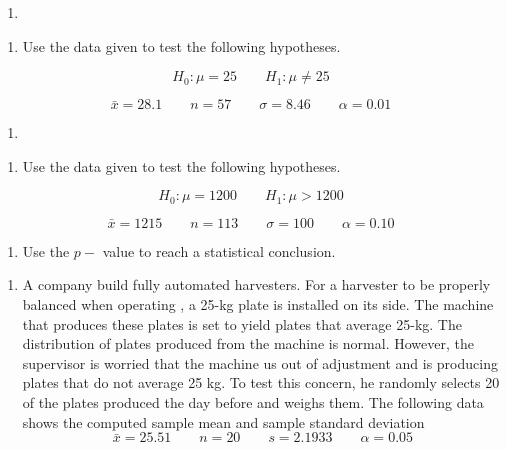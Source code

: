 \documentclass[]{book}
\providecommand{\tightlist}{%
  \setlength{\itemsep}{0pt}\setlength{\parskip}{0pt}}
\begin{document}
\begin{enumerate}
\def\labelenumi{\arabic{enumi}.}
\setcounter{enumi}{1}
\item
\end{enumerate}

\begin{enumerate}
\def\labelenumi{\alph{enumi}.}
\tightlist
\item
  Use the data given to test the following hypotheses.
\end{enumerate}

\[H_0: \mu =25\qquad H_1:\mu\neq 25\]

\[\bar{x}=28.1\qquad n=57 \qquad \sigma =8.46 \qquad \alpha =0.01\]

\begin{enumerate}
\def\labelenumi{\arabic{enumi}.}
\setcounter{enumi}{2}
\item
\end{enumerate}

\begin{enumerate}
\def\labelenumi{\alph{enumi}.}
\tightlist
\item
  Use the data given to test the following hypotheses.
\end{enumerate}

\[H_0: \mu =1200\qquad H_1:\mu> 1200\]

\[\bar{x}=1215\qquad n=113 \qquad \sigma =100 \qquad \alpha =0.10\]

\begin{enumerate}
\def\labelenumi{\alph{enumi}.}
\setcounter{enumi}{1}
\tightlist
\item
  Use the \(p-\) value to reach a statistical conclusion.
\end{enumerate}

\begin{enumerate}
\def\labelenumi{\arabic{enumi}.}
\setcounter{enumi}{3}
\tightlist
\item
  A company build fully automated harvesters. For a harvester to be properly balanced when operating , a 25-kg plate is installed on its side. The machine that produces these plates is set to yield plates that average 25-kg. The distribution of plates produced from the machine is normal. However, the supervisor is worried that the machine us out of adjustment and is producing plates that do not average 25 kg. To test this concern, he randomly selects 20 of the plates produced the day before and weighs them. The following data shows the computed sample mean and sample standard deviation
  \[\bar{x}=25.51\qquad n=20 \qquad s =2.1933 \qquad \alpha =0.05\]
\end{enumerate}
\end{document}
